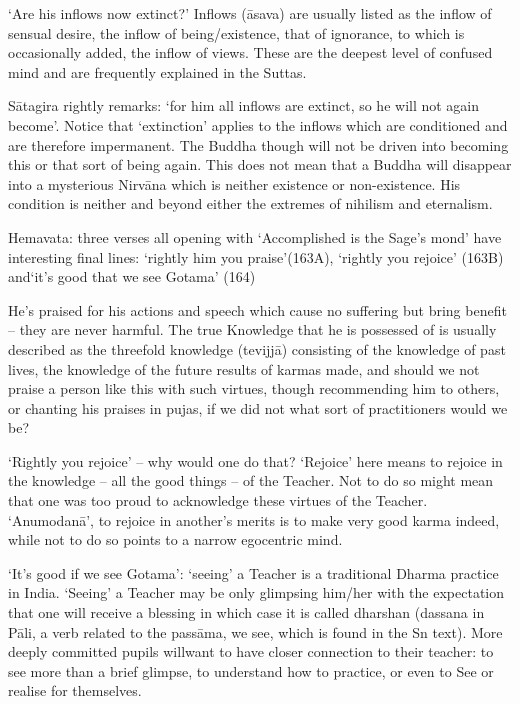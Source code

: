 `Are his inflows now extinct?' Inflows (\=asava) are usually listed as the inflow of sensual desire, the inflow of being/existence, that of ignorance, to which is occasionally added, the inflow of views. These are the deepest level of confused mind and are frequently explained in the Suttas.
   
S\=atagira rightly remarks: `for him all inflows are extinct, so he will not again become'. Notice that `extinction' applies to the inflows which are conditioned and are therefore impermanent. The Buddha though will not be driven into becoming this or that sort of being again. This does not mean that a Buddha will disappear into a mysterious Nirv\=ana which is neither existence or non-existence. His condition is neither and beyond either the extremes of nihilism and eternalism.
   
Hemavata: three verses all opening with `Accomplished is the Sage's mond' have interesting final lines:
`rightly him you praise'(163A), `rightly you rejoice' (163B) and`it's good that we see Gotama' (164)
   
He's praised for his actions and speech which cause no suffering but bring benefit – they are never harmful. The true Knowledge that he is possessed of is usually described as the threefold knowledge (tevijj\=a) consisting of the knowledge of past lives, the knowledge of the future results of karmas made, and should we not praise a person like this with such virtues, though recommending him to others, or chanting his praises in pujas, if we did not what sort of practitioners would we be?
   
`Rightly you rejoice' – why would one do that? `Rejoice' here means to rejoice in the knowledge – all the good things – of the Teacher. Not to do so might mean that one was too proud to acknowledge these virtues of the Teacher. `Anumodan\=a', to rejoice in another's merits is to make very good karma indeed, while not to do so points to a narrow egocentric mind.
   
`It's good if we see Gotama': `seeing' a Teacher is a traditional Dharma practice in India. `Seeing' a Teacher may be only glimpsing him/her with the expectation that one will receive a blessing in which case it is called dharshan (dassana in P\=ali, a verb related to the pass\=ama, we see, which is found in the Sn text). More deeply committed pupils willwant to have closer connection to their teacher: to see more than a brief glimpse, to understand how to practice, or even to See or realise for themselves.
   
